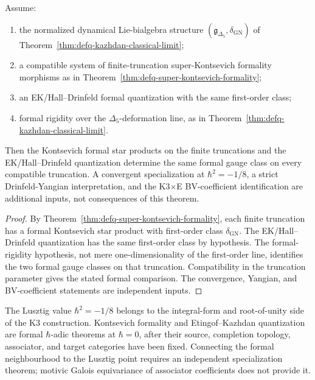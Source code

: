 \begin{theorem}
\label{thm:defq-unified-kontsevich-theorem}
Assume:
\begin{enumerate}[label=\textup{(\roman*)}]
\item the normalized dynamical Lie-bialgebra structure
\((\mathfrak g_{\Delta_5},\delta_{\mathrm{GN}})\) of
Theorem~\ref{thm:defq-kazhdan-classical-limit};
\item a compatible system of finite-truncation super-Kontsevich
formality morphisms as in
Theorem~\ref{thm:defq-super-kontsevich-formality};
\item an EK/Hall--Drinfeld formal quantization with the same
first-order class;
\item formal rigidity over the \(\Delta_5\)-deformation line, as in
Theorem~\ref{thm:defq-kazhdan-classical-limit}.
\end{enumerate}
Then the Kontsevich formal star products on the finite truncations and
the EK/Hall--Drinfeld quantization determine the same formal gauge
class on every compatible truncation. A convergent specialization at
\(\hbar^2=-1/8\), a strict Drinfeld-Yangian interpretation, and the
K3\(\times\)E BV-coefficient identification are additional inputs, not
consequences of this theorem.
\end{theorem}

\begin{proof}
By Theorem~\ref{thm:defq-super-kontsevich-formality}, each finite
truncation has a formal Kontsevich star product with first-order
class \(\delta_{\mathrm{GN}}\). The EK/Hall--Drinfeld quantization has
the same first-order class by hypothesis. The formal-rigidity
hypothesis, not mere one-dimensionality of the first-order line,
identifies the two formal gauge classes on that truncation.
Compatibility in the truncation parameter gives the stated formal
comparison. The convergence, Yangian, and BV-coefficient statements are
independent inputs.
\end{proof}

\begin{remark}
\label{rem:defq-motivic-lusztig-reading}
The Lusztig value $\hbar^2=-1/8$ belongs to the integral-form and
root-of-unity side of the K3 construction. Kontsevich formality and
Etingof--Kazhdan quantization are formal \(\hbar\)-adic theorems at
\(\hbar=0\), after their source, completion topology, associator, and
target categories have been fixed. Connecting the formal neighbourhood to the Lusztig point
requires an independent specialization theorem; motivic Galois
equivariance of associator coefficients does not provide it.
\end{remark}

